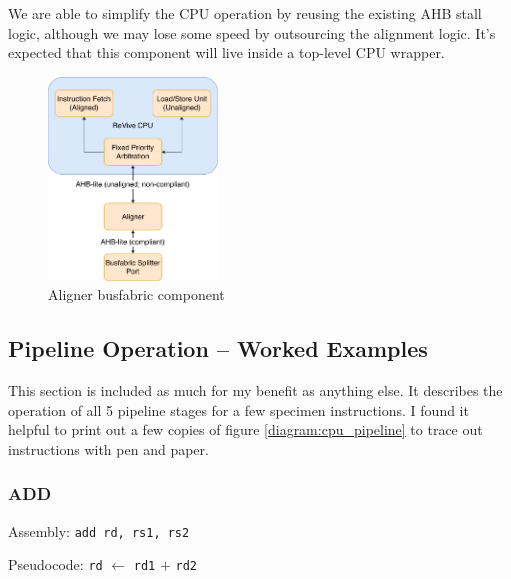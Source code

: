 \documentclass{article}
\begin{document}
We are able to simplify the CPU operation by reusing the existing AHB stall logic, although we may lose some speed by outsourcing the alignment logic. It's expected that this component will live inside a top-level CPU wrapper.

\begin{figure}[!htb]
\centering
\label{diagram:unaligned_accesses}
\caption{Aligner busfabric component}
\includegraphics[width=0.4\textwidth]{diagrams/unaligned_accesses.pdf}
\end{figure}

\subsection{Pipeline Operation -- Worked Examples}

This section is included as much for my benefit as anything else. It describes the operation of all 5 pipeline stages for a few specimen instructions. I found it helpful to print out a few copies of figure \ref{diagram:cpu_pipeline} to trace out instructions with pen and paper.

\subsubsection{ADD}

Assembly: \texttt{add rd, rs1, rs2}

Pseudocode: \texttt{rd} $\leftarrow$ \texttt{rd1} $+$ \texttt{rd2}
\end{document}
